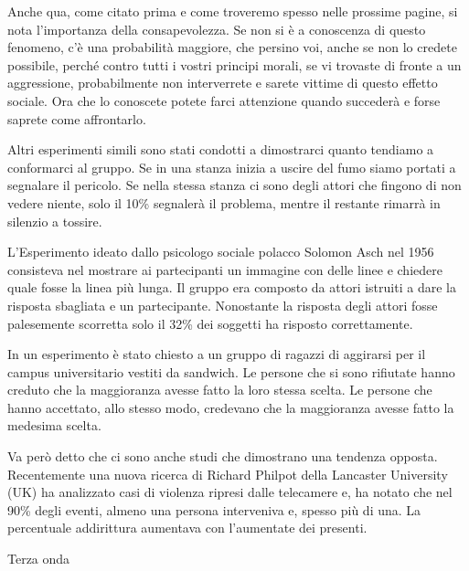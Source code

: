 \documentclass[12pt]{book} %
\begin{document}
Anche qua, come citato prima e come troveremo spesso nelle prossime pagine, si nota l'importanza
della consapevolezza. Se non si è a conoscenza di questo fenomeno, c'è una probabilità maggiore,
che persino voi, anche se non lo credete possibile, perché contro tutti i vostri principi morali, se vi trovaste di
fronte a un aggressione, probabilmente non interverrete e sarete vittime di questo effetto sociale. Ora che lo
conoscete potete farci attenzione quando succederà e forse saprete come affrontarlo. 


\bigskip
\begin{mdframed}[linewidth=1pt]
Altri esperimenti simili sono stati condotti a dimostrarci quanto tendiamo a conformarci al gruppo. Se in una stanza
inizia a uscire del fumo siamo portati a segnalare il pericolo. Se nella stessa stanza ci sono degli attori che fingono
di non vedere niente, solo il 10\% segnalerà il problema, mentre il restante rimarrà in silenzio a tossire.


\bigskip

L'Esperimento ideato dallo psicologo sociale polacco Solomon Asch nel 1956 consisteva nel mostrare ai partecipanti un
immagine con delle linee e chiedere quale fosse la linea più lunga. Il gruppo era composto da attori istruiti a dare la
risposta sbagliata e un partecipante. Nonostante la risposta degli attori fosse palesemente scorretta solo il 32\% dei
soggetti ha risposto correttamente.


\bigskip

In un esperimento è stato chiesto a un gruppo di ragazzi di aggirarsi per il campus universitario vestiti da sandwich.
Le persone che si sono rifiutate hanno creduto che la maggioranza avesse fatto la loro stessa scelta. Le persone che
hanno accettato, allo stesso modo, credevano che la maggioranza avesse fatto la medesima scelta.


\bigskip

Va però detto che ci sono anche studi che dimostrano una tendenza opposta. Recentemente una nuova ricerca di Richard
Philpot della Lancaster University (UK) ha analizzato casi di violenza ripresi dalle telecamere e, ha notato che nel
90\% degli eventi, almeno una persona interveniva e, spesso più di una. La percentuale addirittura aumentava con
l'aumentate dei presenti.


\bigskip

Terza onda


\end{mdframed}
\end{document}
